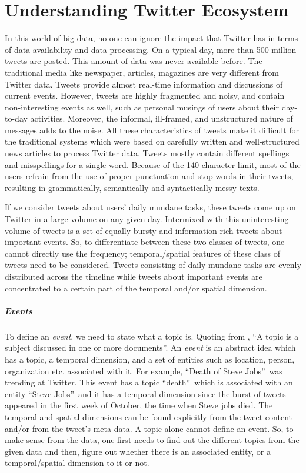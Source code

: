 \chapter{Understanding Twitter Ecosystem}

In this world of big data, no one can ignore the impact that Twitter has in terms of data availability and data processing. On a typical day, more than 500 million tweets are posted. This amount of data was never available before. The traditional media like newspaper, articles, magazines are very different from Twitter data. Tweets provide almost real-time information and discussions of current events. However, tweets are highly fragmented and noisy, and contain non-interesting events as well, such as personal musings of users about their day-to-day activities. Moreover, the informal, ill-framed, and unstructured nature of messages adds to the noise. All these characteristics of tweets make it difficult for the traditional systems which were based on carefully written and well-structured news articles to process Twitter data. Tweets mostly contain different spellings and misspellings for a single word. Because of the 140 character limit, most of the users refrain from the use of proper punctuation and stop-words in their tweets, resulting in grammatically, semantically and syntactically messy texts.

If we consider tweets about users' daily mundane tasks, these tweets come up on Twitter in a large volume on any given day. Intermixed with this uninteresting volume of tweets is a set of equally bursty and information-rich tweets about important events. So, to differentiate between these two classes of tweets, one cannot directly use the frequency; temporal/spatial features of these class of tweets need to be considered. Tweets consisting of daily mundane tasks are evenly distributed across the timeline while tweets about important events are concentrated to a certain part of the temporal and/or spatial dimension.

\paragraph{Events}
To define an \emph{event}, we need to state what a topic is. Quoting from \cite{zhao2011comparing}, \textquotedblleft A topic is a subject discussed in one or more documents\textquotedblright. An \emph{event} is an abstract idea which has a topic, a temporal dimension, and a set of entities such as location, person, organization etc. associated with it. For example, \textquotedblleft Death of Steve Jobs\textquotedblright~was trending at Twitter. This event has a topic \textquotedblleft death\textquotedblright~which is associated with an entity \textquotedblleft Steve Jobs\textquotedblright~and it has a temporal dimension since the burst of tweets appeared in the first week of October, the time when Steve jobs died. The temporal and spatial dimensions can be found explicitly from the tweet content and/or from the tweet's meta-data. A topic alone cannot define an event. So, to make sense from the data, one first needs to find out the different topics from the given data and then, figure out whether there is an associated entity, or a temporal/spatial dimension to it or not.